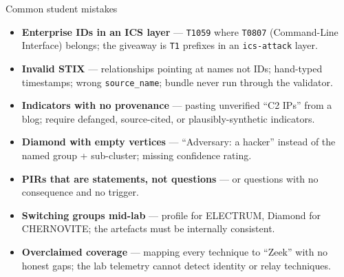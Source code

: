 \documentclass[11pt,a4paper]{article}
\begin{document}
\begin{solutionbox}{Common student mistakes}
\begin{itemize}[leftmargin=*, nosep]
  \item \textbf{Enterprise IDs in an ICS layer} --- \texttt{T1059} where
        \texttt{T0807} (Command-Line Interface) belongs; the giveaway is
        \texttt{T1} prefixes in an \texttt{ics-attack} layer.
  \item \textbf{Invalid STIX} --- relationships pointing at names not IDs;
        hand-typed timestamps; wrong \texttt{source\_name}; bundle never run
        through the validator.
  \item \textbf{Indicators with no provenance} --- pasting unverified ``C2 IPs''
        from a blog; require defanged, source-cited, or plausibly-synthetic
        indicators.
  \item \textbf{Diamond with empty vertices} --- ``Adversary: a hacker'' instead
        of the named group + sub-cluster; missing confidence rating.
  \item \textbf{PIRs that are statements, not questions} --- or questions with no
        consequence and no trigger.
  \item \textbf{Switching groups mid-lab} --- profile for ELECTRUM, Diamond for
        CHERNOVITE; the artefacts must be internally consistent.
  \item \textbf{Overclaimed coverage} --- mapping every technique to ``Zeek''
        with no honest gaps; the lab telemetry cannot detect identity or relay
        techniques.
\end{itemize}
\end{solutionbox}
\end{document}
